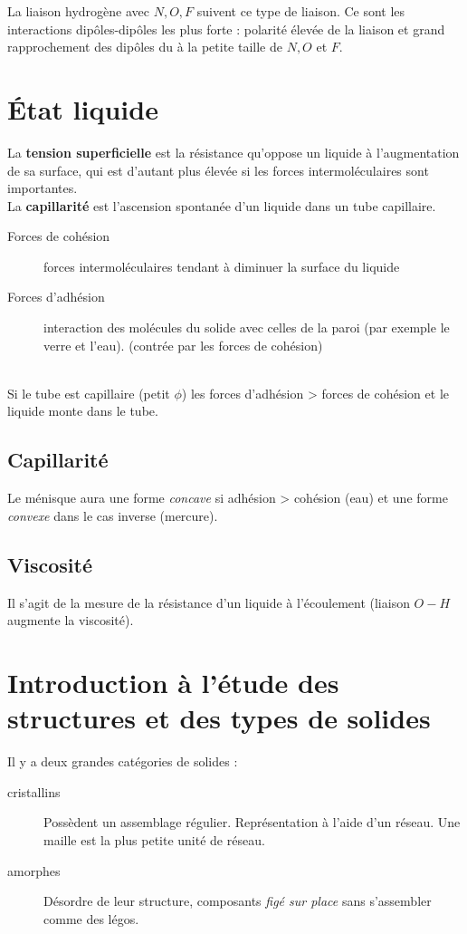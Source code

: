 \documentclass	[11pt, a4paper, openany]{book}
\begin{document}
	La liaison hydrogène avec $N, O, F$ suivent ce type de liaison. Ce sont les interactions dipôles-dipôles les plus forte : polarité élevée de la liaison et grand rapprochement des dipôles du à la petite taille de $N, O$ et $F$.
	
	\section{État liquide}
	La \textbf{tension superficielle} est la résistance qu'oppose un liquide à l'augmentation de sa surface, qui est d'autant plus élevée si les forces intermoléculaires sont importantes.\\
	
	La \textbf{capillarité} est l'ascension spontanée d'un liquide dans un tube capillaire.
	\begin{description}
		\item[Forces de cohésion] forces intermoléculaires tendant à diminuer la surface du liquide
		\item[Forces d'adhésion] interaction des molécules du solide avec celles de la paroi (par exemple le verre et l'eau). (contrée par les forces de cohésion)
	\end{description}
	\ \\
	Si le tube est capillaire (petit $\phi$) les forces d'adhésion > forces de cohésion et le liquide monte dans le tube.
	
	\subsection*{Capillarité}
	Le ménisque aura une forme \textit{concave} si adhésion > cohésion (eau) et une forme \textit{convexe} dans le cas inverse (mercure).
	
	\subsection*{Viscosité}
	Il s'agit de la mesure de la résistance d'un liquide à l'écoulement (liaison $O-H$ augmente la viscosité).
	
	\section{Introduction à l'étude des structures et des types de solides}
	Il y a deux grandes catégories de solides : 
	\begin{description}
		\item[cristallins] Possèdent un assemblage régulier. Représentation à l'aide d'un réseau. Une maille est la plus petite unité de réseau.
		\item[amorphes] Désordre de leur structure, composants \textit{figé sur place} sans s'assembler comme des légos.
	\end{description}
	
\end{document}
